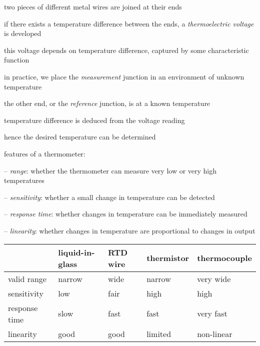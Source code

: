 two pieces of different metal wires are joined at their ends

if there exists a temperature difference between the ends, a \emph{thermoelectric voltage} is developed

this voltage depends on temperature difference, captured by some characteristic function

in practice, we place the \emph{measurement} junction in an environment of unknown temperature

the other end, or the \emph{reference} junction, is at a known temperature

temperature difference is deduced from the voltage reading

hence the desired temperature can be determined

\vspace*{\baselineskip}

\cmt features of a thermometer:
\begin{compactitem}
	\item[--] \emph{range}: whether the thermometer can measure very low or very high temperatures
	
	\item[--] \emph{sensitivity}: whether a small change in temperature can be detected
	
	\item[--] \emph{response time}: whether changes in temperature can be immediately measured
	
	\item[--] \emph{linearity}: whether changes in temperature are proportional to changes in output
	
\end{compactitem}

%

\begin{center}
	\begin{tabular}{|l|C{2.4cm}|C{2.4cm}|C{2.4cm}|C{2.4cm}|}
		\hline 
		& liquid-in-glass & RTD wire & thermistor & thermocouple \\ 
		\hline 
		valid range & narrow & wide & narrow & very wide \\ 
		\hline 
		sensitivity & low & fair & high & high \\ 
		\hline 
		response time & slow & fast & fast & very fast \\ 
		\hline 
		linearity & good & good & limited & non-linear \\ 
		\hline 
	\end{tabular} 
\end{center}


